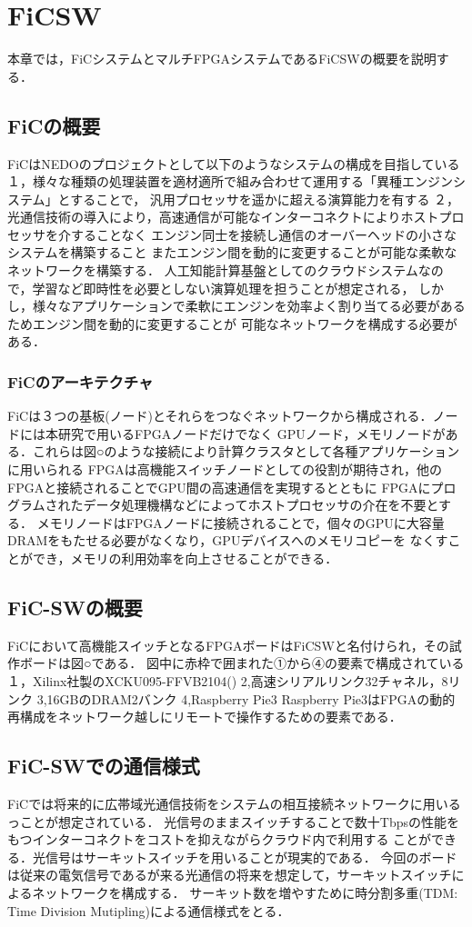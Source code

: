 \chapter{FiCSW}
{
\label{chap:ficsw}
本章では，FiCシステムとマルチFPGAシステムであるFiCSWの概要を説明する．

\section{FiCの概要}
\label{sec:about_fic}
FiCはNEDOのプロジェクトとして以下のようなシステムの構成を目指している
１，様々な種類の処理装置を適材適所で組み合わせて運用する「異種エンジンシステム」とすることで，
汎用プロセッサを遥かに超える演算能力を有する
２，光通信技術の導入により，高速通信が可能なインターコネクトによりホストプロセッサを介することなく
エンジン同士を接続し通信のオーバーヘッドの小さなシステムを構築すること
またエンジン間を動的に変更することが可能な柔軟なネットワークを構築する．
人工知能計算基盤としてのクラウドシステムなので，学習など即時性を必要としない演算処理を担うことが想定される，
しかし，様々なアプリケーションで柔軟にエンジンを効率よく割り当てる必要があるためエンジン間を動的に変更することが
可能なネットワークを構成する必要がある．
\subsection{FiCのアーキテクチャ}
\label{sec:arch_fic}
FiCは３つの基板(ノード)とそれらをつなぐネットワークから構成される．ノードには本研究で用いるFPGAノードだけでなく
GPUノード，メモリノードがある．これらは図○のような接続により計算クラスタとして各種アプリケーションに用いられる
FPGAは高機能スイッチノードとしての役割が期待され，他のFPGAと接続されることでGPU間の高速通信を実現するとともに
FPGAにプログラムされたデータ処理機構などによってホストプロセッサの介在を不要とする．
メモリノードはFPGAノードに接続されることで，個々のGPUに大容量DRAMをもたせる必要がなくなり，GPUデバイスへのメモリコピーを
なくすことができ，メモリの利用効率を向上させることができる．
\section{FiC-SWの概要}
\label{sec:about_ficsw}
FiCにおいて高機能スイッチとなるFPGAボードはFiCSWと名付けられ，その試作ボードは図○である．
図中に赤枠で囲まれた①から④の要素で構成されている
１，Xilinx社製のXCKU095-FFVB2104()
2,高速シリアルリンク32チャネル，8リンク
3,16GBのDRAM2バンク
4,Raspberry Pie3
Raspberry Pie3はFPGAの動的再構成をネットワーク越しにリモートで操作するための要素である．
\section{FiC-SWでの通信様式}
\label{sec:ficsw_communication}
FiCでは将来的に広帯域光通信技術をシステムの相互接続ネットワークに用いるっことが想定されている．
光信号のままスイッチすることで数十Tbpsの性能をもつインターコネクトをコストを抑えながらクラウド内で利用する
ことができる．光信号はサーキットスイッチを用いることが現実的である．
今回のボードは従来の電気信号であるが来る光通信の将来を想定して，サーキットスイッチによるネットワークを構成する．
サーキット数を増やすために時分割多重(TDM: Time Division Mutipling)による通信様式をとる．


}
